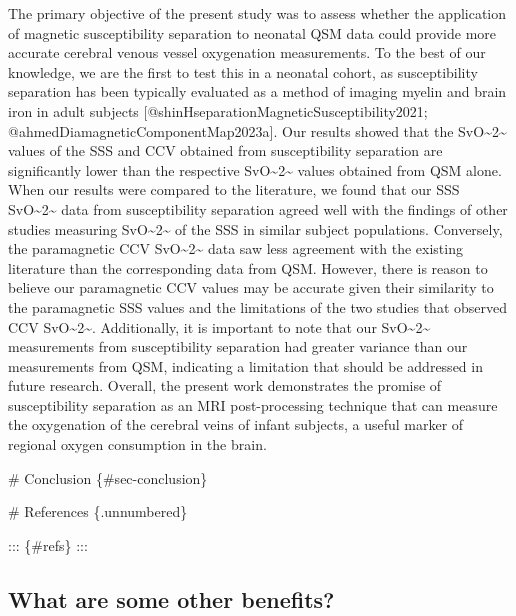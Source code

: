 \documentclass[
  letterpaper,
  DIV=11,
  numbers=noendperiod]{scrartcl}
\newenvironment{Shaded}{\begin{snugshade}}{\end{snugshade}}
\newcommand{\NormalTok}[1]{\textcolor[rgb]{0.00,0.23,0.31}{#1}}
\begin{document}
\begin{Shaded}
\begin{Highlighting}[]
\NormalTok{The primary objective of the present study was to assess whether the application of magnetic susceptibility separation to neonatal QSM data could provide more accurate cerebral venous vessel oxygenation measurements. To the best of our knowledge, we are the first to test this in a neonatal cohort, as susceptibility separation has been typically evaluated as a method of imaging myelin and brain iron in adult subjects [@shinHseparationMagneticSusceptibility2021; @ahmedDiamagneticComponentMap2023a]. Our results showed that the SvO\textasciitilde{}2\textasciitilde{} values of the SSS and CCV obtained from susceptibility separation are significantly lower than the respective SvO\textasciitilde{}2\textasciitilde{} values obtained from QSM alone. When our results were compared to the literature, we found that our SSS SvO\textasciitilde{}2\textasciitilde{} data from susceptibility separation agreed well with the findings of other studies measuring SvO\textasciitilde{}2\textasciitilde{} of the SSS in similar subject populations. Conversely, the paramagnetic CCV SvO\textasciitilde{}2\textasciitilde{} data saw less agreement with the existing literature than the corresponding data from QSM. However, there is reason to believe our paramagnetic CCV values may be accurate given their similarity to the paramagnetic SSS values and the limitations of the two studies that observed CCV SvO\textasciitilde{}2\textasciitilde{}.  Additionally, it is important to note that our SvO\textasciitilde{}2\textasciitilde{} measurements from susceptibility separation had greater variance than our measurements from QSM, indicating a limitation that should be addressed in future research. Overall, the present work demonstrates the promise of susceptibility separation as an MRI post{-}processing technique that can measure the oxygenation of the cerebral veins of infant subjects, a useful marker of regional oxygen consumption in the brain. }


\NormalTok{\# Conclusion \{\#sec{-}conclusion\}}

\NormalTok{\# References \{.unnumbered\}}

\NormalTok{::: \{\#refs\}}
\NormalTok{:::}
\end{Highlighting}
\end{Shaded}

\subsection{What are some other
benefits?}\label{what-are-some-other-benefits}
\end{document}

